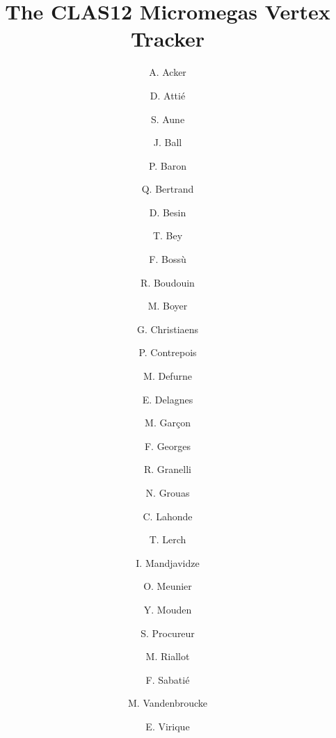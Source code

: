 \title{The CLAS12 Micromegas Vertex Tracker}

\author{A. Acker} 
\author{D. Atti\'e}
\author{S. Aune}
\author{J. Ball}
\author{P. Baron}
\author{Q. Bertrand}
\author{D. Besin}
\author{T. Bey}
\author{F. Boss\`u}
\author{R. Boudouin}
\author{M. Boyer}
\author{G. Christiaens}
\author{P. Contrepois}
\author{M. Defurne}
\author{E. Delagnes}
\author{M. Gar\c con}
\author{F. Georges}
\author{R. Granelli}
\author{N. Grouas}
\author{C. Lahonde}
\author{T. Lerch}
\author{I. Mandjavidze}
\author{O. Meunier}
\author{Y. Mouden}
\author{S. Procureur}
\author{M. Riallot}
\author{F. Sabati\'e}
\author{M. Vandenbroucke}
\author{E. Virique}

\address{Irfu, CEA, Universit\'{e} Paris-Saclay, 91191, Gif-sur-Yvette, France}
